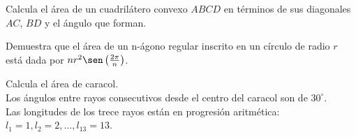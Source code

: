 
\begin{problema}
Calcula el área de un cuadrilátero convexo $ABCD$ en términos de sus diagonales $AC$, $BD$ y el ángulo que forman.
\end{problema}


\begin{problema}
Demuestra que el área de un n-ágono regular inscrito en un círculo de radio $r$ está dada por $nr^2 \sen \left(\frac{2\pi}{n} \right)$.
\end{problema}

\begin{problema}


\begin{multicols}{2}
Calcula el área de caracol.\\

Los ángulos entre rayos consecutivos desde el centro del caracol son de $30^{\circ}$.\\

Las longitudes de los trece rayos están en progresión aritmética: \\

$l_1=1, l_2=2, \dots, l_{13}=13$. 

\columnbreak


\end{multicols}
\end{problema}
